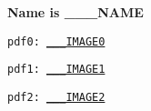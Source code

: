 
\textbf{Name is ___NAME}

\texttt{pdf0: \url{___IMAGE0}}

\texttt{pdf1: \url{___IMAGE1}}

\texttt{pdf2: \url{___IMAGE2}}

\newpage
